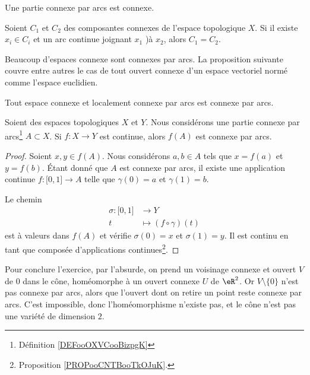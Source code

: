 \begin{lemma}		\label{LEMooQPYMooRKVSrv}
	Une partie connexe par arcs est connexe.
\end{lemma}

\begin{proposition}	\label{PROPooQUPRooPtyHoP}
	Soient \( C_1\) et \( C_2\) des composantes connexes de l'espace topologique \( X\). Si il existe \( x_i\in C_i\) et un arc continue joignant \( x_1\) )à \( x_2\), alors \( C_1=C_2\).
\end{proposition}


Beaucoup d'espaces connexe sont connexes par arcs. La proposition suivante couvre entre autres le cas de tout ouvert connexe d'un espace vectoriel normé comme l'espace euclidien.

\begin{proposition}       \label{PROPooYFDBooHbBjzF}
	Tout espace connexe et localement connexe par arcs est connexe par arcs.
\end{proposition}


\begin{lemma}       \label{LEMooTVQMooFxrFaT}
	Soient des espaces topologiques \( X\) et \( Y\). Nous considérons une partie connexe par arcs\footnote{Définition \ref{DEFooOXVCooBizpgK}} \(A\subset X\). Si \(f \colon X\to Y  \) est continue, alors \( f(A) \) est connexe par arcs.
\end{lemma}

\begin{proof}
	Soient \( x,y\in f(A)\). Nous considérons \( a,b\in A\) tels que \( x=f(a)\) et \( y=f(b)\). Étant donné que \( A\) est connexe par arcs, il existe une application continue \(f \colon \mathopen[ 0,1\mathclose]\to A  \) telle que \( \gamma(0)=a\) et \( \gamma(1)=b\).

	Le chemin
	\begin{equation}
		\begin{aligned}
			\sigma\colon \mathopen[ 0,1\mathclose] & \to Y                     \\
			t                                      & \mapsto (f\circ\gamma)(t)
		\end{aligned}
	\end{equation}
	est à valeurs dans \( f(A)\) et vérifie \( \sigma(0)=x\) et \( \sigma(1)=y\). Il est continu en tant que composée d'applications continues\footnote{Proposition \ref{PROPooCNTBooTkOJuK}.}.
\end{proof}


Pour conclure l'exercice, par l'absurde, on prend un voisinage
connexe et ouvert \( V\) de \( 0\) dans le cône, homéomorphe à un ouvert
connexe \( U\) de \( \eR^2\). Or \( V\setminus\{0\}\) n'est pas connexe par
arcs, alors que l'ouvert dont on retire un point reste connexe par
arcs. C'est impossible, donc l'homéomorphisme n'existe pas, et le
cône n'est pas une variété de dimension \( 2\).

